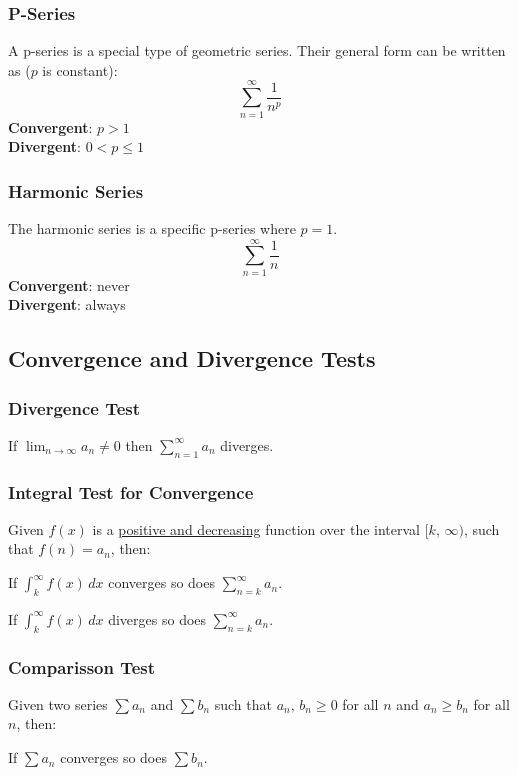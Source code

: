 \documentclass[12pt]{article}
\begin{document}
\subsubsection{P-Series}
A p-series is a special type of geometric series. Their general form can be written as ($p$ is constant):
\[ \sum_{n=1}^\infty \frac{1}{n^p} \]
\textbf{Convergent}: $p > 1$
\\ \textbf{Divergent}: $0 < p \le 1$

\subsubsection{Harmonic Series}
The harmonic series is a specific p-series where $p=1$.
\[ \sum_{n=1}^\infty \frac{1}{n} \]
\textbf{Convergent}: never
\\ \textbf{Divergent}: always

\subsection{Convergence and Divergence Tests}
\subsubsection{Divergence Test}
If $\displaystyle \lim_{n \to \infty} a_n \ne 0$ then $\displaystyle \sum_{n=1}^\infty a_n$ diverges.

\subsubsection{Integral Test for Convergence}
Given $f(x)$ is a \underline{positive and decreasing} function over the interval $[k, \, \infty)$, such that $f(n) = a_n$, then:

\noindent If $\displaystyle \int_k^\infty f(x) \, dx$ converges so does $\displaystyle \sum_{n=k}^\infty a_n$.

\noindent If $\displaystyle \int_k^\infty f(x) \, dx$ diverges so does $\displaystyle \sum_{n=k}^\infty a_n$.

\subsubsection{Comparisson Test}
Given two series $\displaystyle \sum a_n$ and $\displaystyle \sum b_n$ such that $a_n, \, b_n \ge 0$ for all $n$ and $a_n \ge b_n$ for all $n$, then:

\noindent If $\displaystyle \sum a_n$ converges so does $\displaystyle \sum b_n$.
\end{document}
